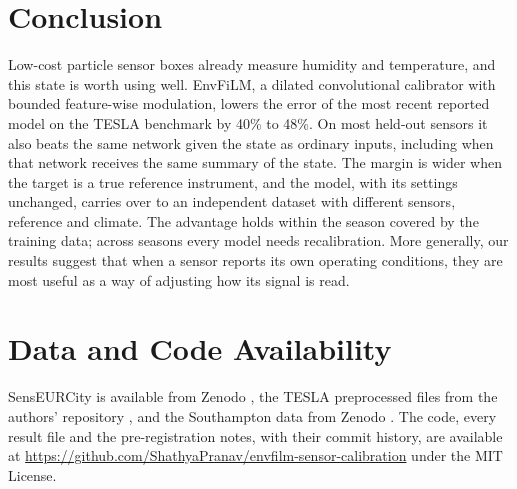 \documentclass[journal]{IEEEtran}
\begin{document}
\section{Conclusion}

Low-cost particle sensor boxes already measure humidity and temperature, and this state is worth using well. EnvFiLM,
a dilated convolutional calibrator with bounded feature-wise modulation, lowers the error of the most recent reported
model on the TESLA benchmark by 40\% to 48\%. On most held-out sensors it also beats the same network given the state as
ordinary inputs, including when that network receives the same summary of the state. The margin is wider when the target
is a true reference instrument, and the model, with its settings unchanged, carries over to an independent dataset with
different sensors, reference and climate. The advantage holds within the season covered by the training data;
across seasons every model needs recalibration. More generally, our results suggest that when a
sensor reports its own operating conditions, they are most useful as a way of adjusting how its signal is read.

\section*{Data and Code Availability}
SensEURCity is available from Zenodo \cite{vanpoppel2023}, the TESLA preprocessed files from the authors' repository
\cite{ahn2025}, and the Southampton data from Zenodo \cite{bulot2022data,bulot2022onboard}. The code, every result file and
the pre-registration notes, with their commit history, are available at
\url{https://github.com/ShathyaPranav/envfilm-sensor-calibration} under the MIT License.
\end{document}
